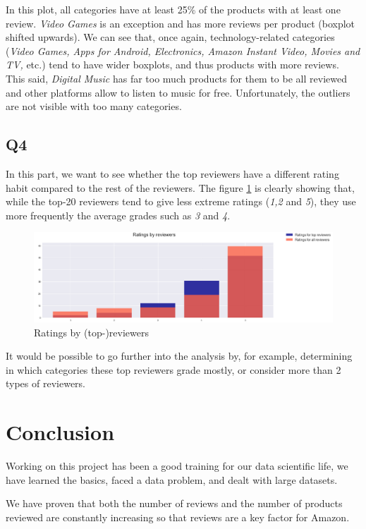 \documentclass[11pt]{article}
\begin{document}
In this plot, all categories have at least 25\% of the products with at least one review. {\em Video Games} is an exception and has more reviews per product (boxplot shifted upwards). We can see that, once again, technology-related categories ({\em Video Games, Apps for Android, Electronics, Amazon Instant Video, Movies and TV,} etc.) tend to have wider boxplots, and thus products with more reviews. This said, {\em Digital Music} has far too much products for them to be all reviewed and other platforms allow to listen to music for free. 
Unfortunately, the outliers are not visible with too many categories.

\subsection{Q4}

In this part, we want to see whether the top reviewers have a different rating habit compared to the rest of the reviewers. The figure \ref{q4} is clearly showing that, while the top-20 reviewers tend to give less extreme ratings ({\em 1,2} and {\em 5}), they use more frequently the average grades such as {\em 3} and {\em 4}.

\begin{figure}[!h]
\centering
\includegraphics[width=1\linewidth]{q4.png}
\caption{Ratings by (top-)reviewers}
\label{q4}
\end{figure}

It would be possible to go further into the analysis by, for example, determining in which categories these top reviewers grade mostly, or consider more than 2 types of reviewers.

\section{Conclusion}

Working on this project has been a good training for our data scientific life, we have learned the basics, faced a data problem, and dealt with large datasets.

We have proven that both the number of reviews and the number of products reviewed are constantly increasing so that reviews are a key factor for Amazon.
\end{document}
